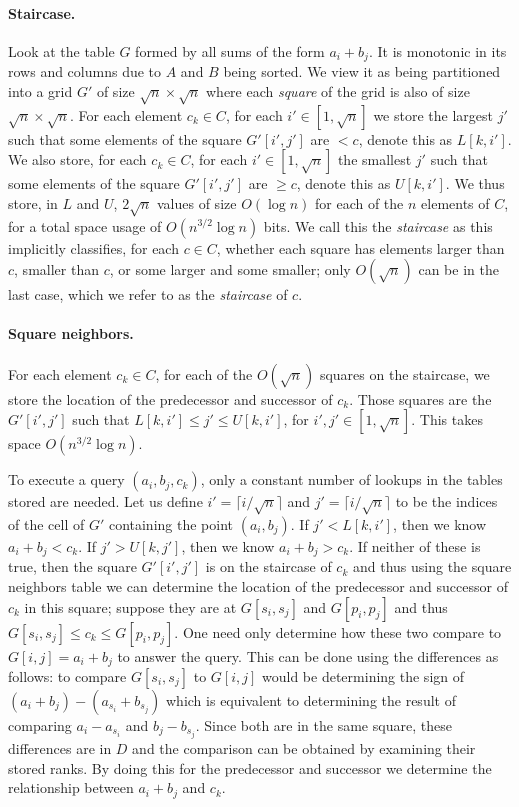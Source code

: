\paragraph{Staircase.}
  Look at the table $G$ formed by all sums of the form $a_i+b_j$. It is
  monotonic in its rows and columns due to $A$ and $B$ being sorted. We view it
  as being partitioned into a grid $G'$ of size $\sqrt{n}\times \sqrt{n}$ where
  each \emph{square} of the grid is also of size $\sqrt{n}\times \sqrt{n}$.
  For each element $c_k \in C$, for each $i'\in[1,\sqrt{n}]$ we store the largest
  $j'$ such that some elements of the square $G'[i',j']$ are  $< c$, denote this as
  $L[k,i']$.
  We also store, for each $c_k \in C$, for each $i'\in[1,\sqrt{n}]$ the smallest
  $j'$ such that some elements of the square $G'[i',j']$ are  $\geq c$, denote this as
  $U[k,i']$.
  We thus store, in $L$ and $U$, $2 \sqrt{n}$ values of size $O(\log n)$ for each
  of the $n$ elements of $C$, for a total space usage of $O(n^{3/2}\log n)$ bits.
  We call this the \emph{staircase} as this implicitly classifies, for each $c
  \in C$, whether each square has elements larger than $c$, smaller than $c$, or
  some larger and some smaller; only $O(\sqrt{n})$ can be in the last case, which
  we refer to as the \emph{staircase} of $c$.

\paragraph{Square neighbors.}
  For each element $c_k \in C$, for each of the $O(\sqrt{n})$ squares on the
  staircase, we store the location of the predecessor and successor of $c_k$.
  Those squares are the \(G'[i',j']\) such that
  $L[k,i'] \le j' \le U[k,i']$, for $i',j' \in [1,\sqrt{n}]$.
  This takes space $O(n^{3/2}\log n)$.

To execute a query $(a_i,b_j,c_k)$, only a constant number of lookups in the
tables stored are needed.
Let us define \(i' = \lceil i / \sqrt{n} \rceil\)
and \(j' = \lceil i / \sqrt{n} \rceil\) to be the indices of the cell of
\(G'\) containing the point \((a_i, b_j)\).
If $j' < L[k,i']$, then we know $a_i + b_j < c_k$.
If $j' > U[k,j']$, then we know $a_i + b_j > c_k$.
If neither of these is true, then the square $G'[i',j']$ is on the staircase of
$c_k$ and thus using
the square neighbors table we can determine the location of the predecessor and
successor of $c_k$ in this square; suppose they are at $G[s_i,s_j]$ and
$G[p_i,p_j]$ and thus $G[s_i,s_j] \leq c_k \leq G[p_i,p_j]$. One need only
determine how these two compare to $G[i,j]=a_i+b_j$ to answer the query.
%
This can be done using the differences as follows: to compare $G[s_i,s_j]$ to
$G[i,j]$ would be determining the sign of $(a_i+b_j)-(a_{s_i}+b_{s_j})$
which is equivalent to determining the result of comparing $a_i-a_{s_i}$ and
$b_j-b_{s_j}$.
%
Since both are in the same square, these differences are
in $D$ and the comparison can be obtained by examining their stored ranks.
%
By doing this for the predecessor and successor we determine the
relationship between $a_i+b_j$ and $c_k$.

